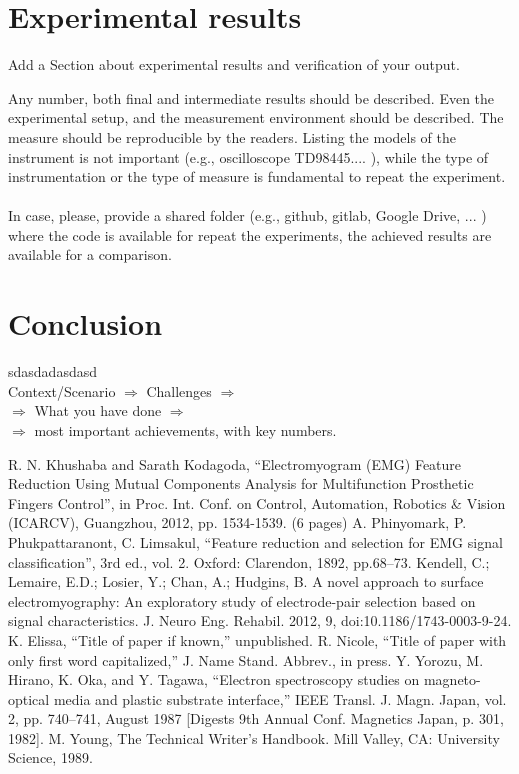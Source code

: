 \documentclass[journal]{IEEEtran}
\begin{document}
\section{Experimental results}
Add a Section about experimental results and verification of your output. 

Any number, both final and intermediate results should be described. Even the experimental setup, and the measurement environment should be described. The measure should be reproducible by the readers. Listing the models of the instrument is not important (e.g.,  oscilloscope TD98445.... ), while the type of instrumentation or the type of measure is fundamental to repeat the experiment. \\
\\
In case, please, provide a shared folder (e.g., github, gitlab, Google Drive, ... ) where the code is available for repeat the experiments, the achieved results are available for a comparison. 



\section{Conclusion}
sdasdadasdasd
\\
Context/Scenario  $\Rightarrow$  Challenges  $\Rightarrow$\\
 $\Rightarrow$ What you have done $\Rightarrow$ \\
 $\Rightarrow$ most important achievements, with key numbers. 
\\

\begin{thebibliography}{00}
	 R. N. Khushaba and Sarath Kodagoda, ``Electromyogram (EMG) Feature Reduction Using Mutual Components Analysis for Multifunction Prosthetic Fingers Control'', in Proc. Int. Conf. on Control, Automation, Robotics \& Vision (ICARCV), Guangzhou, 2012, pp. 1534-1539. (6 pages)
	 A. Phinyomark, P. Phukpattaranont, C. Limsakul, ``Feature reduction and selection for EMG signal classification'', 3rd ed., vol. 2. Oxford: Clarendon, 1892, pp.68--73.
	 Kendell, C.; Lemaire, E.D.; Losier, Y.; Chan, A.; Hudgins, B. A novel approach to surface electromyography:
	An exploratory study of electrode-pair selection based on signal characteristics. J. Neuro Eng. Rehabil. 2012,
	9, doi:10.1186/1743-0003-9-24.
	 K. Elissa, ``Title of paper if known,'' unpublished.
	 R. Nicole, ``Title of paper with only first word capitalized,'' J. Name Stand. Abbrev., in press.
	 Y. Yorozu, M. Hirano, K. Oka, and Y. Tagawa, ``Electron spectroscopy studies on magneto-optical media and plastic substrate interface,'' IEEE Transl. J. Magn. Japan, vol. 2, pp. 740--741, August 1987 [Digests 9th Annual Conf. Magnetics Japan, p. 301, 1982].
	 M. Young, The Technical Writer's Handbook. Mill Valley, CA: University Science, 1989.
\end{thebibliography}
\end{document}
